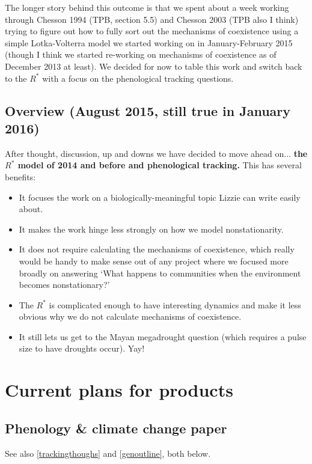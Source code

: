 \documentclass[11pt,a4paper,oneside]{article}
\newenvironment{smitemize}{
\begin{itemize}
  \setlength{\itemsep}{1pt}
  \setlength{\parskip}{0pt}
  \setlength{\parsep}{0pt}}
{\end{itemize}
}
\begin{document}
\noindent The longer story behind this outcome is that we spent about a week working through Chesson 1994 (TPB, section 5.5) and Chesson 2003 (TPB also I think) trying to figure out how to fully sort out the mechanisms of coexistence using a simple Lotka-Volterra model we started working on in January-February 2015 (though I think we started re-working on mechanisms of coexistence as of December 2013 at least). We decided for now to table this work and switch back to the $R^*$ with a focus on the phenological tracking questions. 

\subsection{Overview (August 2015, still true in January 2016)}
After thought, discussion, up and downs we have decided to move ahead
on... {\bf the $R^*$ model of 2014 and before and phenological
  tracking.} This has several benefits:
\begin{smitemize}
\item It focuses the work on a biologically-meaningful topic Lizzie
  can write easily about.
\item It makes the work hinge less strongly on how we model
  nonstationarity.
\item It does not require calculating the mechanisms of coexistence,
  which really would be handy to make sense out of any project where
  we focused more broadly on answering `What happens to communities when the environment
  becomes nonstationary?'
\item The $R^*$ is complicated enough to have interesting dynamics and
  make it less obvious why we do not calculate mechanisms of
  coexistence.
\item It still lets us get to the Mayan megadrought question (which
  requires a pulse size to have droughts occur). Yay!
\end{smitemize}

\section{Current plans for products}
\subsection{Phenology \& climate change paper}\label{phenCCpaper}

See also \ref{trackingthoughs} and \ref{genoutline}, both below.\\
\end{document}
